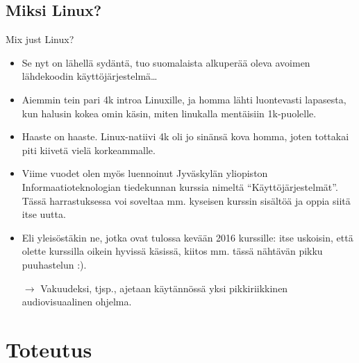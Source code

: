 \documentclass[pdf,10pt]{beamer}
\begin{document}
\subsection{Miksi Linux?}
\begin{frame}{Mix just Linux?}
  \begin{itemize}
    \item Se nyt on lähellä sydäntä, tuo suomalaista alkuperää oleva
      avoimen lähdekoodin käyttöjärjestelmä\ldots
    \item Aiemmin tein pari 4k introa Linuxille, ja homma lähti
      luontevasti lapasesta, kun halusin kokea omin käsin, miten
      linukalla mentäisiin 1k-puolelle.
    \item Haaste on haaste. Linux-natiivi 4k oli jo sinänsä kova
      homma, joten tottakai piti kiivetä vielä korkeammalle.
    \item Viime vuodet olen myös luennoinut Jyväskylän yliopiston
      Informaatioteknologian tiedekunnan kurssia nimeltä
      ``Käyttöjärjestelmät''. Tässä harrastuksessa voi soveltaa mm.
      kyseisen kurssin sisältöä ja oppia siitä itse uutta.
    \item Eli yleisöstäkin ne, jotka ovat tulossa kevään 2016
      kurssille: itse uskoisin, että olette kurssilla oikein hyvissä
      käsissä, kiitos mm. tässä nähtävän pikku puuhastelun :).
    \item[$\rightarrow$] Vakuudeksi, tjsp., ajetaan käytännössä
      yksi pikkiriikkinen audiovisuaalinen ohjelma.
  \end{itemize}
\end{frame}

\section{Toteutus}
\end{document}
